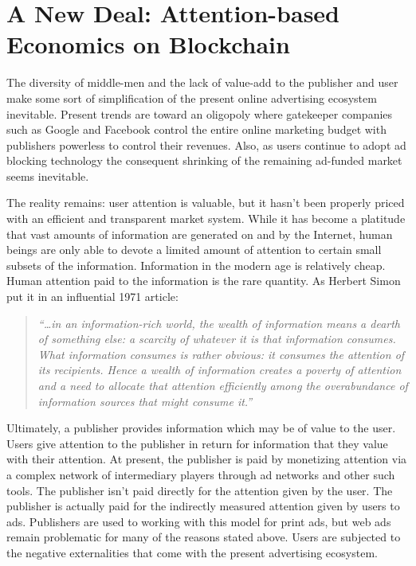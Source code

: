 \documentclass[11pt]{article}
\begin{document}
\section{A New Deal: Attention-based Economics on Blockchain}
\label{sec-4}

The diversity of middle-men and the lack of value-add to the publisher and user make some sort of simplification of the present online advertising ecosystem inevitable. Present trends are toward an oligopoly where gatekeeper companies such as Google and Facebook control the entire online marketing budget with publishers powerless to control their revenues. Also, as users continue to adopt ad blocking technology the consequent shrinking of the remaining ad-funded market seems inevitable. 

The reality remains: user attention is valuable, but it hasn't been properly priced with an efficient and transparent market system. While it has become a platitude that vast amounts of information are generated on and by the Internet, human beings are only able to devote a limited amount of attention to certain small subsets of the information. Information in the modern age is relatively cheap. Human attention paid to the information is the rare quantity. As Herbert Simon put it in an influential 1971 article:

\begin{quote}
\textit{``\ldots{}in an information-rich world, the wealth of information means a dearth of something else: a scarcity of whatever it is that information consumes. What information consumes is rather obvious: it consumes the attention of its recipients. Hence a wealth of information creates a poverty of attention and a need to allocate that attention efficiently among the overabundance of information sources that might consume it.''}
\end{quote}

Ultimately, a publisher provides information which may be of value to the user. Users give attention to the publisher in return for information that they value with their attention. At present, the publisher is paid by monetizing attention via a complex network of intermediary players through ad networks and other such tools. The publisher isn't paid directly for the attention given by the user. The publisher is actually paid for the indirectly measured attention given by users to ads. Publishers are used to working with this model for print ads, but web ads remain problematic for many of the reasons stated above. Users are subjected to the negative externalities that come with the present advertising ecosystem.
\end{document}
